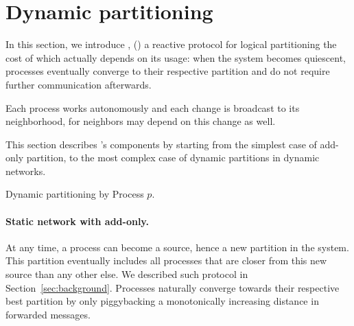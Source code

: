 
\section{Dynamic partitioning}
\label{sec:proposal}


In this section, we introduce \NAME, () a reactive
protocol for logical partitioning the cost of which actually depends
on its usage: when the system becomes quiescent, processes eventually
converge to their respective partition and do not require further
communication afterwards.

Each process works autonomously and each change is broadcast to its
neighborhood, for neighbors may depend on this change as well. 


This section describes \NAME's components by starting from the
simplest case of add-only partition, to the most complex case of
dynamic partitions in dynamic networks. 


\begin{algorithm}
  
  \caption{\label{algo:adddelundo}Dynamic partitioning by Process $p$.}
\end{algorithm}


\paragraph{Static network with add-only.}
At any time, a process can become a source, hence  a
new partition in the system. This partition eventually includes all
processes that are closer from this new source than any other else. We
described such protocol in Section~\ref{sec:background}. Processes
naturally converge towards their respective best partition by only
piggybacking a monotonically increasing distance in forwarded
messages.  

